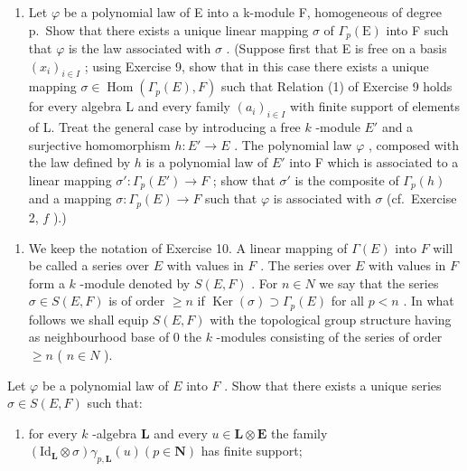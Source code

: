 \begin{enumerate}
\def\labelenumi{\alph{enumi})}
\setcounter{enumi}{1}
\tightlist
\item
  Let \(\varphi\) be a polynomial law of E into a k-module F, homogeneous of degree p.~Show that there exists a unique linear mapping \(\sigma\) of \(\Gamma_{p}(\mathrm{E})\) into F such that \(\varphi\) is the law associated with \(\sigma\) . (Suppose first that E is free on a basis \((x_i)_{i \in I}\) ; using Exercise 9, show that in this case there exists a unique mapping \(\sigma \in \operatorname{Hom}(\Gamma_p(E), F)\) such that Relation (1) of Exercise 9 holds for every algebra L and every family \((a_i)_{i \in I}\) with finite support of elements of L. Treat the general case by introducing a free \(k\) -module \(E'\) and a surjective homomorphism \(h: E' \to E\) . The polynomial law \(\varphi\) , composed with the law defined by \(h\) is a polynomial law of \(E'\) into F which is associated to a linear mapping \(\sigma': \Gamma_p(E') \to F\) ; show that \(\sigma'\) is the composite of \(\Gamma_p(h)\) and a mapping \(\sigma: \Gamma_p(E) \to F\) such that \(\varphi\) is associated with \(\sigma\) (cf.~Exercise 2, \(f\) ).)
\end{enumerate}

\begin{enumerate}
\def\labelenumi{\arabic{enumi})}
\setcounter{enumi}{10}
\tightlist
\item
  We keep the notation of Exercise 10. A linear mapping of \(\Gamma(E)\) into \(F\) will be called a series over \(E\) with values in \(F\) . The series over \(E\) with values in \(F\) form a \(k\) -module denoted by \(S(E, F)\) . For \(n \in N\) we say that the series \(\sigma \in S(E, F)\) is of order \(\geqslant n\) if \(\operatorname{Ker}(\sigma) \supset \Gamma_p(E)\) for all \(p < n\) . In what follows we shall equip \(S(E, F)\) with the topological group structure having as neighbourhood base of 0 the \(k\) -modules consisting of the series of order \(\geqslant n\) ( \(n \in N\) ).
\end{enumerate}

Let \(\varphi\) be a polynomial law of \(E\) into \(F\) . Show that there exists a unique series \(\sigma \in S(E, F)\) such that:

\begin{enumerate}
\def\labelenumi{(\roman{enumi})}
\tightlist
\item
  for every \(k\) -algebra \(\mathbf{L}\) and every \(u \in \mathbf{L} \otimes \mathbf{E}\) the family \((\mathrm{Id}_{\mathbf{L}} \otimes \sigma) \gamma_{p,\mathbf{L}}(u) (p \in \mathbf{N})\) has finite support;
\end{enumerate}

